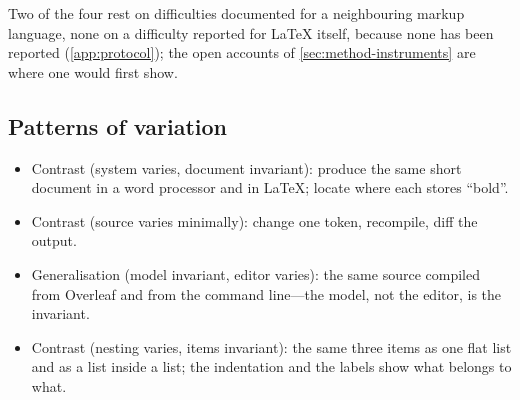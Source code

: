Two of the four rest on difficulties documented for a neighbouring markup
language, none on a difficulty reported for LaTeX itself, because none
has been reported (\cref{app:protocol}); the open accounts of
\cref{sec:method-instruments} are where one would first show.

\subsection{Patterns of variation}

\begin{itemize}
  \item Contrast (system varies, document invariant): produce the same
    short document in a word processor and in LaTeX; locate where each
    stores \enquote{bold}.
  \item Contrast (source varies minimally): change one token, recompile,
    diff the output.
  \item Generalisation (model invariant, editor varies): the same
    source compiled from Overleaf and from the command line---the model,
    not the editor, is the invariant.
  \item Contrast (nesting varies, items invariant): the same three
    items as one flat list and as a list inside a list; the indentation
    and the labels show what belongs to what.
\end{itemize}
